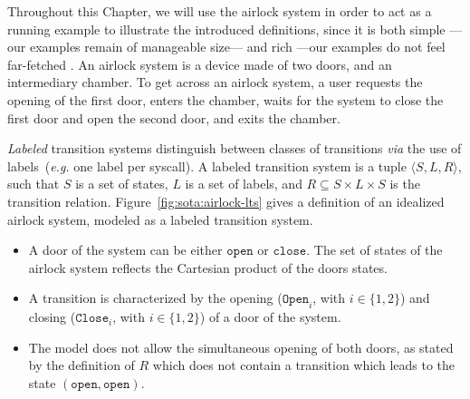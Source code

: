 
Throughout this Chapter, we will use the airlock system in order to act as a
running example to illustrate the introduced definitions, since it is both
simple ---our examples remain of manageable size--- and rich ---our examples do
not feel far-fetched .
%
An airlock system is a device made of two doors, and an intermediary chamber.
%
To get across an airlock system, a user requests the opening of the first door,
enters the chamber, waits for the system to close the first door and open the
second door, and exits the chamber.

\begin{example}
  \label{example:sota:airlocklts}

  \emph{Labeled} transition systems distinguish between classes of transitions
  \emph{via} the use of labels\,\cite{loiseaux1995lts} (\emph{e.g.} one label
  per syscall).
%
  A labeled transition system is a tuple \( \langle S, L, R \rangle \), such
  that \( S \) is a set of states, \( L \) is a set of labels, and
  \( R \subseteq S \times L \times S \) is the transition relation. 
  Figure~\ref{fig:sota:airlock-lts} gives a definition of an idealized airlock
  system, modeled as a labeled transition system.

  \begin{itemize}
  \item A door of the system can be either \( \mathtt{open} \) or
    \( \mathtt{close} \).
    The set of states of the airlock system reflects the Cartesian product of
    the doors states.
  \item A transition is characterized by the opening (\( \mathtt{Open}_i\), with
    \( i \in \{1, 2\} \)) and closing (\( \mathtt{Close}_i \), with
    \( i \in \{1, 2\} \)) of a door of the system.
  \item The model does not allow the simultaneous opening of both doors, as
    stated by the definition of \( R \) which does not contain a transition
    which leads to the state \( (\mathtt{open}, \mathtt{open}) \).
  \end{itemize}
\end{example}

